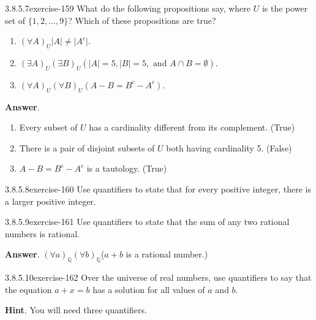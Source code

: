 \documentclass[twoside,10pt,]{book}
\numberwithin{equation}{section}
\begin{document}
\begin{divisionsolution}{3.8.5.7}{}{exercise-159}%
\hypertarget{p-1438}{}%
What do the following propositions say, where \(U\) is the power set of \(\{1,2,\dots , 9\}\)? Which of these propositions are true?%
\par
\hypertarget{p-1439}{}%
\leavevmode%
\begin{enumerate}[label=(\alph*)]
\item\hypertarget{li-793}{}\hypertarget{p-1440}{}%
\((\forall A)_U \lvert A \rvert \neq \lvert A^c \rvert\).%
\item\hypertarget{li-794}{}\hypertarget{p-1441}{}%
\((\exists A)_U(\exists B)_U (\lvert A \rvert =5, \lvert B \rvert=5, \textrm{ and } A\cap B=\emptyset )\).%
\item\hypertarget{li-795}{}\hypertarget{p-1442}{}%
\((\forall A)_U(\forall B)_U (A-B=B^c-A^c)\).%
\end{enumerate}
%
\par\smallskip%
\noindent\textbf{Answer}.\quad%
\hypertarget{p-1443}{}%
\leavevmode%
\begin{enumerate}[label=(\alph*)]
\item\hypertarget{li-796}{}\hypertarget{p-1444}{}%
Every subset of \(U\) has a cardinality different from its complement. (True)%
\item\hypertarget{li-797}{}\hypertarget{p-1445}{}%
There is a pair of disjoint subsets of \(U\) both having cardinality 5. (False)%
\item\hypertarget{li-798}{}\hypertarget{p-1446}{}%
\(A-B=B^c-A^c\) is a tautology. (True)%
\end{enumerate}
%
\end{divisionsolution}%
\begin{divisionsolution}{3.8.5.8}{}{exercise-160}%
\hypertarget{p-1447}{}%
Use quantifiers to state that for every positive integer, there is a larger positive integer.%
\end{divisionsolution}%
\begin{divisionsolution}{3.8.5.9}{}{exercise-161}%
\hypertarget{p-1448}{}%
Use  quantifiers to state that the sum of any two rational numbers is rational.%
\par\smallskip%
\noindent\textbf{Answer}.\quad%
\hypertarget{p-1449}{}%
\((\forall a)_{\mathbb{Q}}(\forall b)_{\mathbb{Q}}\)(\(a+b\) is a rational number.)%
\end{divisionsolution}%
\begin{divisionsolution}{3.8.5.10}{}{exercise-162}%
\hypertarget{p-1450}{}%
Over the universe of real numbers, use quantifiers to say that the equation \(a + x = b\) has a solution for all values of \(a\) and \(b\).%
\par\smallskip%
\noindent\textbf{Hint}.\quad%
\hypertarget{p-1451}{}%
You will need three quantifiers.%
\end{divisionsolution}%
\end{document}
